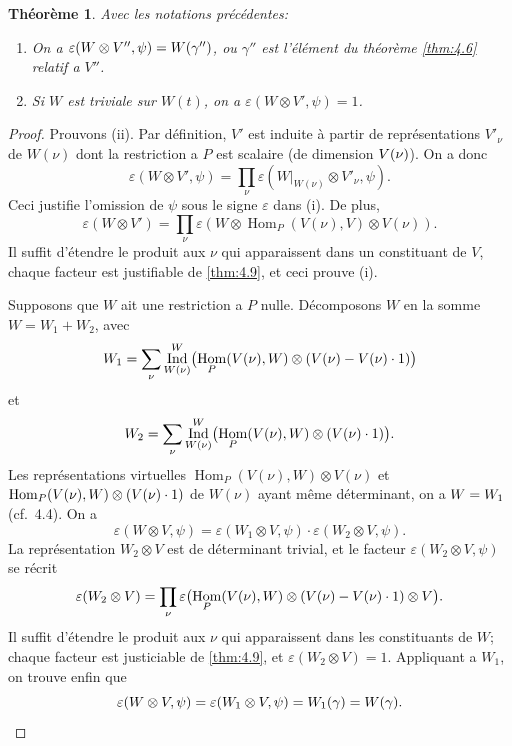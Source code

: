 \documentclass[12pt,a4paper]{article}
\theoremstyle{plain}
\newtheorem{theorem}{Th\'eor\`eme}[section]
\theoremstyle{definition}
\theoremstyle{remark}
\DeclareMathOperator{\Ind}{Ind}
\DeclareMathOperator{\Hom}{Hom}
\let\dim\relax\let\det\relax
\providecommand{\Hom}{\operatorname{Hom}}
\begin{document}
\begin{theorem}\label{thm:4.13}
Avec les notations pr\'ec\'edentes:
\begin{enumerate}[label=(\roman*)]
\item On a $\varepsilon(W \otimes V'', \psi) = \det W(\gamma'')$, ou $\gamma''$ est l'\'el\'ement du th\'eor\`eme \ref{thm:4.6} relatif a $V''$.
\item Si $W$ est triviale sur $W(t)$, on a $\varepsilon(W \otimes V', \psi) = 1$.
\end{enumerate}
\end{theorem}

\begin{proof}
Prouvons (ii). Par d\'efinition, $V'$ est induite \`a partir de repr\'esentations $V'_\nu$ de $W(\nu)$ dont la restriction a $P$ est scalaire (de dimension $\dim V(\nu)$). On a donc
\[
\varepsilon(W \otimes V', \psi) = \prod_\nu \varepsilon(W|_{W(\nu)} \otimes V'_\nu, \psi).
\]
Ceci justifie l'omission de $\psi$ sous le signe $\varepsilon$ dans (i). De plus,
\[
\varepsilon(W \otimes V') = \prod_\nu \varepsilon(W \otimes \Hom_P(V(\nu), V) \otimes V(\nu)).
\]
Il suffit d'\'etendre le produit aux $\nu$ qui apparaissent dans un constituant de $V$, chaque facteur est justifiable de \ref{thm:4.9}, et ceci prouve (i).

Supposons que $W$ ait une restriction a $P$ nulle. D\'ecomposons $W$ en la somme $W = W_1 + W_2$, avec
\[
W_1 = \sum_\nu \Ind_{W(\nu)}^W\bigl(\Hom_P(V(\nu), W) \otimes (V(\nu) - \dim V(\nu) \cdot 1)\bigr)
\]
et
\[
W_2 = \sum_\nu \Ind_{W(\nu)}^W\bigl(\Hom_P(V(\nu), W) \otimes (\dim V(\nu) \cdot 1)\bigr).
\]
Les repr\'esentations virtuelles $\Hom_P(V(\nu), W) \otimes V(\nu)$ et $\Hom_P(V(\nu), W) \otimes (\dim V(\nu) \cdot 1)$ de $W(\nu)$ ayant m\^eme d\'eterminant, on a $\det W = \det W_1$ (cf.~4.4). On a
\[
\varepsilon(W \otimes V, \psi) = \varepsilon(W_1 \otimes V, \psi) \cdot \varepsilon(W_2 \otimes V, \psi).
\]
La repr\'esentation $W_2 \otimes V$ est de d\'eterminant trivial, et le facteur $\varepsilon(W_2 \otimes V, \psi)$ se r\'ecrit
\[
\varepsilon(W_2 \otimes V) = \prod_\nu \varepsilon\bigl(\Hom_P(V(\nu), W) \otimes (V(\nu) - \dim V(\nu) \cdot 1) \otimes V\bigr).
\]
Il suffit d'\'etendre le produit aux $\nu$ qui apparaissent dans les constituants de $W$; chaque facteur est justiciable de \ref{thm:4.9}, et $\varepsilon(W_2 \otimes V) = 1$. Appliquant a $W_1$, on trouve enfin que
\[
\varepsilon(W \otimes V, \psi) = \varepsilon(W_1 \otimes V, \psi) = \det W_1(\gamma) = \det W(\gamma). \qedhere
\]
\end{proof}
\end{document}
